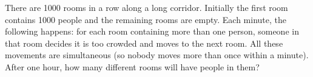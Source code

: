 There are 1000 rooms in a row along a long corridor. Initially the first room contains 1000 people and the remaining rooms are empty. Each minute, the following happens: for each room containing more than one person, someone in that room decides it is too crowded and moves to the next room. All these movements are simultaneous (so nobody moves more than once within a minute). After one hour, how many different
rooms will have people in them?
